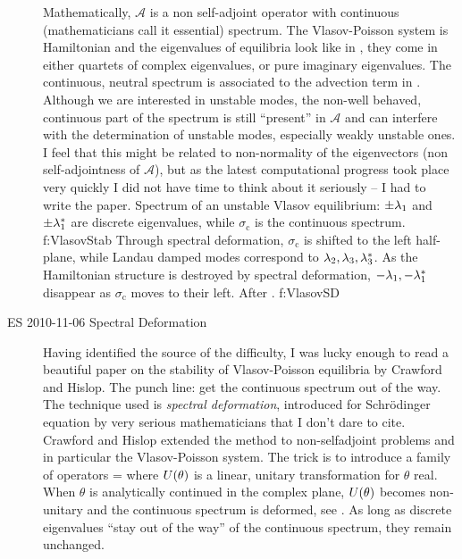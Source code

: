 \begin{description}
Mathematically, $\mathcal{A}$ is a non self-adjoint operator with
continuous (mathematicians call it essential) spectrum.
The Vlasov-Poisson system
is Hamiltonian and the eigenvalues of equilibria look like
in , they come in either quartets of complex eigenvalues,
or pure imaginary eigenvalues. The continuous, neutral spectrum is associated to
the advection term  in .
Although we are interested in unstable modes, the non-well
behaved, continuous part of the spectrum is still ``present'' in $\mathcal{A}$
and can interfere with the determination of unstable modes, especially
weakly unstable ones. I feel that this might be related to non-normality
of the eigenvectors (non self-adjointness of $\mathcal{A}$), but as the
latest computational progress took place very quickly I did not have time to
think about it seriously -- I had to write the paper.
%
{
  Spectrum of an unstable Vlasov equilibrium: $\pm\lambda_1$ and
  $\pm\lambda_1^*$ are discrete eigenvalues, while $\sigma_{\mathrm{c}}$
  is the continuous spectrum.}
{f:VlasovStab}
%
{
  Through spectral deformation,
  $\sigma_{\mathrm{c}}$
  is shifted to the left half-plane, while Landau damped modes correspond
  to $\lambda_2,\lambda_3,\lambda_3^*$. As the Hamiltonian structure
  is destroyed by
  spectral deformation, $-\lambda_1,-\lambda_1^*$ disappear as
  $\sigma_{\mathrm{c}}$ moves to their left. After .}
{f:VlasovSD}
%

\item[ES 2010-11-06 Spectral Deformation]

Having identified the source of the difficulty, I was lucky enough to read a
beautiful paper on the stability of Vlasov-Poisson equilibria
by Crawford and Hislop. The punch line: get the continuous
spectrum out of the way. The technique used is \emph{spectral deformation},
introduced for Schr\"odinger equation by very serious mathematicians that I
don't dare to cite. Crawford and Hislop extended
the method to non-selfadjoint problems and in particular the Vlasov-Poisson
system. The trick is to introduce a family of operators
\beq
  \VlasovLrzSD=\SDop{\theta}\VlasovLrz\SDopI{\theta}
\eeq
where $U(\theta)$ is a linear, unitary transformation for $\theta$ real.
When $\theta$ is analytically continued in the
complex plane, $U(\theta)$ becomes non-unitary and the continuous spectrum
is deformed, see . As long as discrete eigenvalues ``stay
out of the way'' of the continuous spectrum, they remain unchanged.


\end{description}
